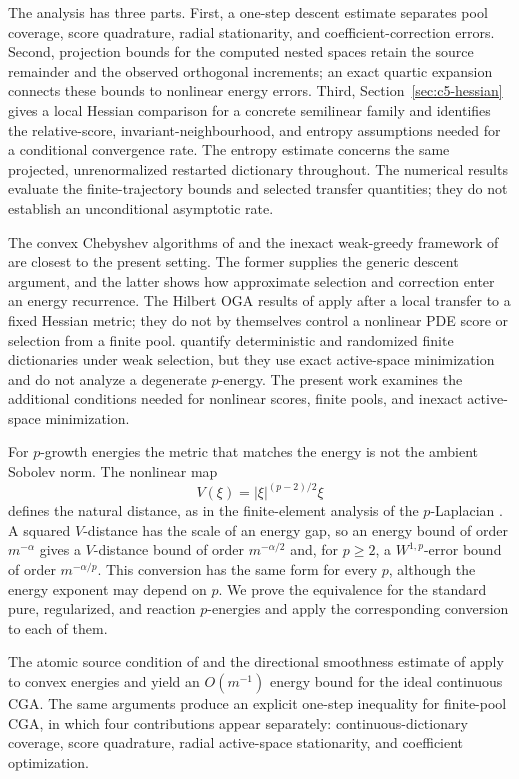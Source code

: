 The analysis has three parts. First, a one-step descent estimate separates pool
coverage, score quadrature, radial stationarity, and coefficient-correction errors.
Second, projection bounds for the computed nested spaces retain the source remainder
and the observed orthogonal increments; an exact quartic expansion connects these
bounds to nonlinear energy errors. Third, Section~\ref{sec:c5-hessian} gives a local
Hessian comparison for a concrete semilinear family and identifies the relative-score,
invariant-neighbourhood, and entropy assumptions needed for a conditional convergence
rate. The entropy estimate concerns the same projected, unrenormalized restarted
dictionary throughout. The numerical results evaluate the finite-trajectory bounds
and selected transfer quantities; they do not establish an unconditional asymptotic rate.

The convex Chebyshev algorithms of \cite{TemlyakovCGA2013,TemlyakovGreedy2014} and the inexact
weak-greedy framework of \cite{DereventsovTemlyakov2022} are closest to the present setting. The
former supplies the generic descent argument, and the latter shows how approximate selection and
correction enter an energy recurrence. The Hilbert OGA results of
\cite{SiegelXuOGA2022,LiSiegelEntropy2024} apply after a local transfer to a fixed Hessian metric;
they do not by themselves control a nonlinear PDE score or selection from a finite pool.
\cite{XuXu2025} quantify deterministic and randomized finite dictionaries under weak selection, but
they use exact active-space minimization and do not analyze a degenerate \(p\)-energy. The present
work examines the additional conditions needed for nonlinear scores, finite pools, and inexact
active-space minimization.

For \(p\)-growth energies the metric that matches the energy is not the ambient Sobolev norm. The
nonlinear map
\[
  V(\xi)=|\xi|^{(p-2)/2}\xi
\]
defines the natural distance, as in the finite-element analysis of the \(p\)-Laplacian
\citep{BarrettLiu1993,DieningKreuzer2008,LeePark2025}. A squared \(V\)-distance has the scale of an
energy gap, so an energy bound of order \(m^{-\alpha}\) gives a \(V\)-distance bound of order
\(m^{-\alpha/2}\) and, for \(p\geq2\), a \(W^{1,p}\)-error bound of order \(m^{-\alpha/p}\). This
conversion has the same form for every \(p\), although the energy exponent may depend on \(p\). We
prove the equivalence for the standard pure, regularized, and reaction \(p\)-energies and apply the
corresponding conversion to each of them.

The atomic source condition of  and the directional smoothness estimate of
 apply to convex energies and yield an \(O(m^{-1})\) energy bound for the ideal
continuous CGA. The same arguments produce an explicit one-step inequality for finite-pool CGA, in
which four contributions appear separately: continuous-dictionary coverage, score quadrature, radial
active-space stationarity, and coefficient optimization.

